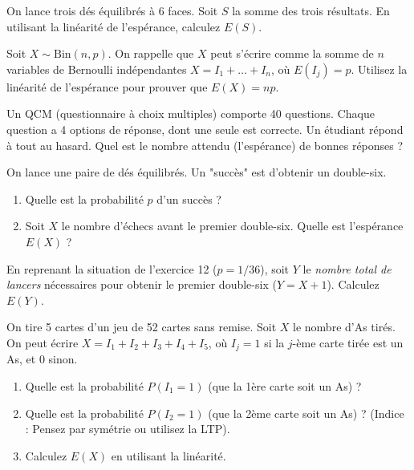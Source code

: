 \begin{exercicebox}
On lance trois dés équilibrés à 6 faces. Soit $S$ la somme des trois résultats.
En utilisant la linéarité de l'espérance, calculez $E(S)$.
\end{exercicebox}

\begin{exercicebox}
Soit $X \sim \text{Bin}(n, p)$. On rappelle que $X$ peut s'écrire comme la somme de $n$ variables de Bernoulli indépendantes $X = I_1 + \dots + I_n$, où $E(I_j) = p$.
Utilisez la linéarité de l'espérance pour prouver que $E(X) = np$.
\end{exercicebox}


\begin{exercicebox}
Un QCM (questionnaire à choix multiples) comporte 40 questions. Chaque question a 4 options de réponse, dont une seule est correcte. Un étudiant répond à tout au hasard.
Quel est le nombre attendu (l'espérance) de bonnes réponses ?
\end{exercicebox}

\begin{exercicebox}
On lance une paire de dés équilibrés. Un "succès" est d'obtenir un double-six.
\begin{enumerate}
    \item Quelle est la probabilité $p$ d'un succès ?
    \item Soit $X$ le nombre d'échecs avant le premier double-six. Quelle est l'espérance $E(X)$ ?
\end{enumerate}
\end{exercicebox}

\begin{exercicebox}
En reprenant la situation de l'exercice 12 ($p=1/36$), soit $Y$ le \textit{nombre total de lancers} nécessaires pour obtenir le premier double-six ($Y = X + 1$).
Calculez $E(Y)$.
\end{exercicebox}

\begin{exercicebox}
On tire 5 cartes d'un jeu de 52 cartes sans remise. Soit $X$ le nombre d'As tirés. On peut écrire $X = I_1 + I_2 + I_3 + I_4 + I_5$, où $I_j=1$ si la $j$-ème carte tirée est un As, et 0 sinon.
\begin{enumerate}
    \item Quelle est la probabilité $P(I_1 = 1)$ (que la 1ère carte soit un As) ?
    \item Quelle est la probabilité $P(I_2 = 1)$ (que la 2ème carte soit un As) ? (Indice : Pensez par symétrie ou utilisez la LTP).
    \item Calculez $E(X)$ en utilisant la linéarité.
\end{enumerate}
\end{exercicebox}


